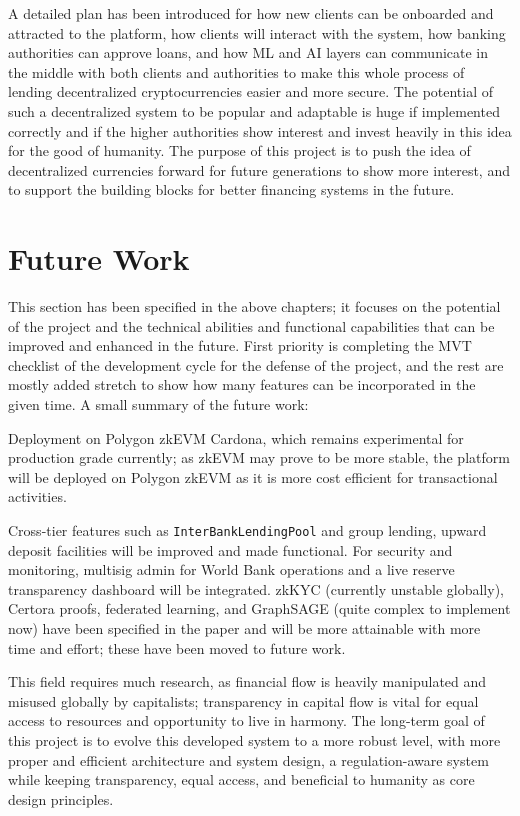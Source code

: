 \documentclass[12pt,a4paper]{report}
\begin{document}
A detailed plan has been introduced for how new clients can be onboarded and attracted to the platform, how clients will interact with the system, how banking authorities can approve loans, and how ML and AI layers can communicate in the middle with both clients and authorities to make this whole process of lending decentralized cryptocurrencies easier and more secure. The potential of such a decentralized system to be popular and adaptable is huge if implemented correctly and if the higher authorities show interest and invest heavily in this idea for the good of humanity. The purpose of this project is to push the idea of decentralized currencies forward for future generations to show more interest, and to support the building blocks for better financing systems in the future.

\section{Future Work}
\label{sec:future-work}

This section has been specified in the above chapters; it focuses on the potential of the project and the technical abilities and functional capabilities that can be improved and enhanced in the future. First priority is completing the MVT checklist of the development cycle for the defense of the project, and the rest are mostly added stretch to show how many features can be incorporated in the given time. A small summary of the future work:

Deployment on Polygon zkEVM Cardona, which remains experimental for production grade currently; as zkEVM may prove to be more stable, the platform will be deployed on Polygon zkEVM as it is more cost efficient for transactional activities.

Cross-tier features such as \texttt{InterBankLendingPool} and group lending, upward deposit facilities will be improved and made functional. For security and monitoring, multisig admin for World Bank operations and a live reserve transparency dashboard will be integrated. zkKYC (currently unstable globally), Certora proofs, federated learning, and GraphSAGE (quite complex to implement now) have been specified in the paper and will be more attainable with more time and effort; these have been moved to future work.

This field requires much research, as financial flow is heavily manipulated and misused globally by capitalists; transparency in capital flow is vital for equal access to resources and opportunity to live in harmony. The long-term goal of this project is to evolve this developed system to a more robust level, with more proper and efficient architecture and system design, a regulation-aware system while keeping transparency, equal access, and beneficial to humanity as core design principles.
\end{document}
